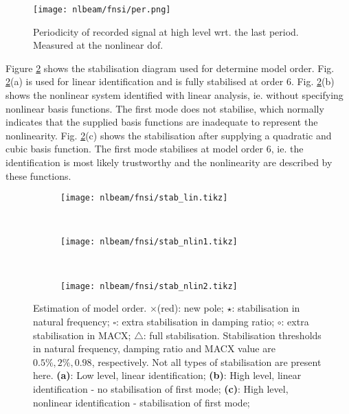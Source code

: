 \begin{figure}[!ht]
  \centering
  \texttt{[image: nlbeam/fnsi/per.png]}
  \caption{Periodicity of recorded signal at high level wrt. the last period.
    Measured at the nonlinear dof.}
  \label{fig:nlbeam_per}
\end{figure}

Figure \ref{fig:nlbeam_stab} shows the stabilisation diagram used for determine
model order. Fig. \ref{fig:nlbeam_stab}(a) is used for linear identification and
is fully stabilised at order 6. Fig. \ref{fig:nlbeam_stab}(b) shows the
nonlinear system identified with linear analysis, ie. without specifying
nonlinear basis functions. The first mode does not stabilise, which normally
indicates that the supplied basis functions are inadequate to represent the
nonlinearity. Fig. \ref{fig:nlbeam_stab}(c) shows the stabilisation after
supplying a quadratic and cubic basis function. The first mode stabilises at
model order 6, ie. the identification is most likely trustworthy and the
nonlinearity are described by these functions.

\begin{figure}
  \centering
    \begin{subfigure}[b]{0.45\textwidth}
      \texttt{[image: nlbeam/fnsi/stab\_lin.tikz]}
    \end{subfigure}
    ~
    \begin{subfigure}[b]{0.45\textwidth}
      \texttt{[image: nlbeam/fnsi/stab\_nlin1.tikz]}
    \end{subfigure}
    \\
    \begin{subfigure}[b]{0.45\textwidth}
      \texttt{[image: nlbeam/fnsi/stab\_nlin2.tikz]}
    \end{subfigure}
    \caption{Estimation of model order.
    $\pmb\times$(red): new pole;
    $\pmb\star$: stabilisation in natural frequency;
    $\pmb\square$: extra stabilisation in damping ratio;
    $\pmb\circ$: extra stabilisation in MACX;
    $\pmb\triangle$: full stabilisation.
    Stabilisation thresholds in natural frequency, damping ratio and MACX value
    are $0.5\%, 2\%, 0.98$, respectively. Not all types of stabilisation are
    present here.
    \textbf{(a)}: Low level, linear identification;
    \textbf{(b)}: High level, linear identification - no stabilisation of first mode;
    \textbf{(c)}: High level, nonlinear identification - stabilisation of first mode;
  }
  \label{fig:nlbeam_stab}
\end{figure}


